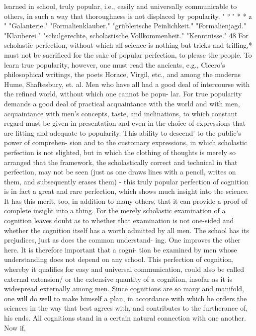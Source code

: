 learned in school, truly popular, i.e., easily and universally communicable
to others, in such a way that thoroughness is not displaced by popularity.
"
°
"
*
*
z
"
"Galanterie."
"Formalienklauber."
"grüblerische Peinlichkeit."
"Formalienjagd."
"Klauberei."
"schulgerechte, scholastische Vollkommenheit."
"Kenntnisse."
48
For scholastic perfection, without which all science is nothing but tricks
and trifling,* must not be sacrificed for the sake of popular perfection, to
please the people.
To learn true popularity, however, one must read the ancients, e.g.,
Cicero's philosophical writings, the poets Horace, Virgil, etc., and among
the moderns Hume, Shaftesbury, et. al. Men who have all had a good deal
of intercourse with the refined world, without which one cannot be popu-
lar. For true popularity demands a good deal of practical acquaintance
with the world and with men, acquaintance with men's concepts, taste,
and inclinations, to which constant regard must be given in presentation
and even in the choice of expressions that are fitting and adequate to
popularity. This ability to descend' to the public's power of comprehen-
sion and to the customary expressions, in which scholastic perfection is
not slighted, but in which the clothing of thoughts is merely so arranged
that the framework, the scholastically correct and technical in that perfection,
may not be seen (just as one draws lines with a pencil, writes on them, and
subsequently erases them) - this truly popular perfection of cognition is
in fact a great and rare perfection, which shows much insight into the
science. It has this merit, too, in addition to many others, that it can
provide a proof of complete insight into a thing. For the merely scholastic
examination of a cognition leaves doubt as to whether that examination is
not one-sided and whether the cognition itself has a worth admitted by all
men. The school has its prejudices, just as does the common understand-
ing. One improves the other here. It is therefore important that a cogni-
tion be examined by men whose understanding does not depend on any
school.
This perfection of cognition, whereby it qualifies for easy and universal
communication, could also be called external extension/ or the extensive
quantity of a cognition, insofar as it is widespread externally among men.
Since cognitions are so many and manifold, one will do well to make
himself a plan, in accordance with which he orders the sciences in the way
that best agrees with, and contributes to the furtherance of, his ends. All
cognitions stand in a certain natural connection with one another. Now if,
